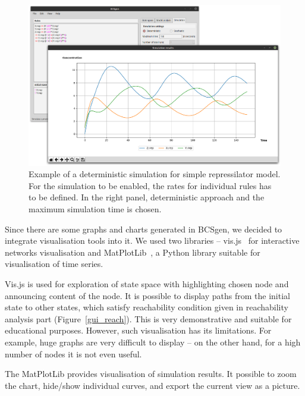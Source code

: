 \documentclass[12pt, twoside]{fithesis2} %
\begin{document}
\begin{figure}[!h]
\begin{center}
\includegraphics[scale=0.23]{pics/BCSgen_simulation}
\caption{Example of a deterministic simulation for simple repressilator model. For the simulation to be enabled, the rates for individual rules has to be defined. In the right panel, deterministic approach and the maximum simulation time is chosen.}\label{gui_simulation}
\end{center}
\end{figure}

Since there are some graphs and charts generated in BCSgen, we decided to integrate visualisation tools into it. We used two libraries -- vis.js~\cite{almende2016vis} for interactive networks visualisation and MatPlotLib~\cite{hunter2007matplotlib}, a Python library suitable for visualisation of time series.

Vis.js is used for exploration of state space with highlighting chosen node and announcing content of the node. It is possible to display paths from the initial state to other states, which satisfy reachability condition given in reachability analysis part (Figure~\ref{gui_reach}). This is very demonstrative and suitable for educational purposes. However, such visualisation has its limitations. For example, huge graphs are very difficult to display -- on the other hand, for a high number of nodes it is not even useful.

The MatPlotLib provides visualisation of simulation results. It possible to zoom the chart, hide/show individual curves, and export the current view as a picture.
\end{document}
